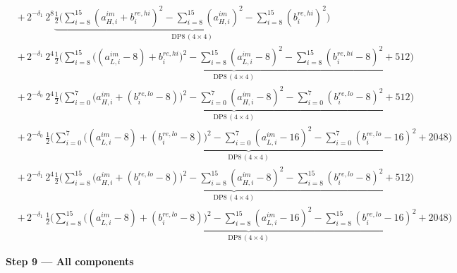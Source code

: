 \documentclass[fleqn]{article}
\newcommand{\DPop}[3]{\mathrm{DP#1}\,(#2\!\times\!#3)}
\begin{document}
\begin{align*}
  & +\, 2^{-\delta_1}\,2^{8}\underbrace{\tfrac12\Big(\sum_{i=8}^{15}(a_{H,i}^{im}{+}b_i^{re,hi})^2 - \sum_{i=8}^{15}(a_{H,i}^{im})^2 - \sum_{i=8}^{15}(b_i^{re,hi})^2\Big)}_{\DPop{8}{4}{4}} \\[0.6em]
  & +\, 2^{-\delta_1}\,2^{4}\underbrace{\tfrac12\Big(\sum_{i=8}^{15}\big((a_{L,i}^{im}{-}8){+}b_i^{re,hi}\big)^2 - \sum_{i=8}^{15}(a_{L,i}^{im}{-}8)^2 - \sum_{i=8}^{15}(b_i^{re,hi}{-}8)^2 + 512\Big)}_{\DPop{8}{4}{4}} \\[0.6em]
  & +\, 2^{-\delta_0}\,2^{4}\underbrace{\tfrac12\Big(\sum_{i=0}^{7}\big(a_{H,i}^{im}{+}(b_i^{re,lo}{-}8)\big)^2 - \sum_{i=0}^{7}(a_{H,i}^{im}{-}8)^2 - \sum_{i=0}^{7}(b_i^{re,lo}{-}8)^2 + 512\Big)}_{\DPop{8}{4}{4}} \\[0.6em]
  & +\, 2^{-\delta_0}\,\underbrace{\tfrac12\Big(\sum_{i=0}^{7}\big((a_{L,i}^{im}{-}8){+}(b_i^{re,lo}{-}8)\big)^2 - \sum_{i=0}^{7}(a_{L,i}^{im}{-}16)^2 - \sum_{i=0}^{7}(b_i^{re,lo}{-}16)^2 + 2048\Big)}_{\DPop{8}{4}{4}} \\[0.6em]
  & +\, 2^{-\delta_1}\,2^{4}\underbrace{\tfrac12\Big(\sum_{i=8}^{15}\big(a_{H,i}^{im}{+}(b_i^{re,lo}{-}8)\big)^2 - \sum_{i=8}^{15}(a_{H,i}^{im}{-}8)^2 - \sum_{i=8}^{15}(b_i^{re,lo}{-}8)^2 + 512\Big)}_{\DPop{8}{4}{4}} \\[0.6em]
  & +\, 2^{-\delta_1}\,\underbrace{\tfrac12\Big(\sum_{i=8}^{15}\big((a_{L,i}^{im}{-}8){+}(b_i^{re,lo}{-}8)\big)^2 - \sum_{i=8}^{15}(a_{L,i}^{im}{-}16)^2 - \sum_{i=8}^{15}(b_i^{re,lo}{-}16)^2 + 2048\Big)}_{\DPop{8}{4}{4}}
\end{align*}

\textbf{Step 9 --- All components}
\end{document}
